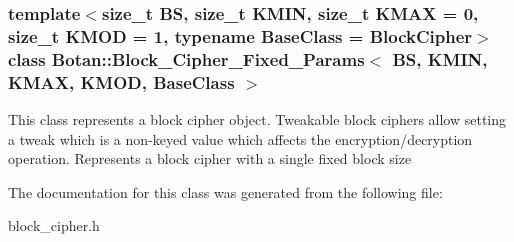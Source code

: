 \subsubsection*{template$<$size\+\_\+t BS, size\+\_\+t K\+M\+IN, size\+\_\+t K\+M\+AX = 0, size\+\_\+t K\+M\+OD = 1, typename Base\+Class = Block\+Cipher$>$\newline
class Botan\+::\+Block\+\_\+\+Cipher\+\_\+\+Fixed\+\_\+\+Params$<$ B\+S, K\+M\+I\+N, K\+M\+A\+X, K\+M\+O\+D, Base\+Class $>$}

This class represents a block cipher object. Tweakable block ciphers allow setting a tweak which is a non-\/keyed value which affects the encryption/decryption operation. Represents a block cipher with a single fixed block size 

The documentation for this class was generated from the following file\+:\begin{DoxyCompactItemize}
\item 
block\+\_\+cipher.\+h\end{DoxyCompactItemize}
